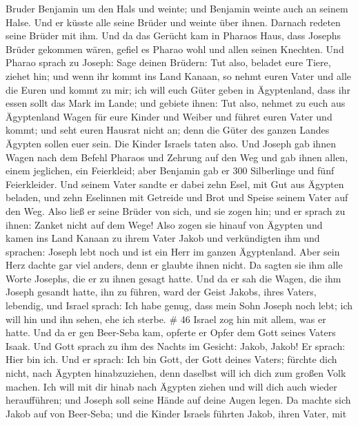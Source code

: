 Bruder Benjamin um den Hals und weinte; und Benjamin weinte auch an
seinem Halse.  Und er küsste alle seine Brüder und weinte
über ihnen. Darnach redeten seine Brüder mit ihm.  Und da
das Gerücht kam in Pharaos Haus, dass Josephs Brüder gekommen wären,
gefiel es Pharao wohl und allen seinen Knechten.  Und
Pharao sprach zu Joseph: Sage deinen Brüdern: Tut also, beladet eure
Tiere, ziehet hin;  und wenn ihr kommt ins Land Kanaan, so
nehmt euren Vater und alle die Euren und kommt zu mir; ich will euch
Güter geben in Ägyptenland, dass ihr essen sollt das Mark im Lande;
 und gebiete ihnen: Tut also, nehmet zu euch aus
Ägyptenland Wagen für eure Kinder und Weiber und führet euren Vater und
kommt;  und seht euren Hausrat nicht an; denn die Güter des
ganzen Landes Ägypten sollen euer sein.  Die Kinder Israels
taten also. Und Joseph gab ihnen Wagen nach dem Befehl Pharaos und
Zehrung auf den Weg  und gab ihnen allen, einem jeglichen,
ein Feierkleid; aber Benjamin gab er 300 Silberlinge und fünf
Feierkleider.  Und seinem Vater sandte er dabei zehn Esel,
mit Gut aus Ägypten beladen, und zehn Eselinnen mit Getreide und Brot
und Speise seinem Vater auf den Weg.  Also ließ er seine
Brüder von sich, und sie zogen hin; und er sprach zu ihnen: Zanket nicht
auf dem Wege!  Also zogen sie hinauf von Ägypten und kamen
ins Land Kanaan zu ihrem Vater Jakob  und verkündigten ihm
und sprachen: Joseph lebt noch und ist ein Herr im ganzen Ägyptenland.
Aber sein Herz dachte gar viel anders, denn er glaubte ihnen nicht.
 Da sagten sie ihm alle Worte Josephs, die er zu ihnen
gesagt hatte. Und da er sah die Wagen, die ihm Joseph gesandt hatte, ihn
zu führen, ward der Geist Jakobs, ihres Vaters, lebendig, 
und Israel sprach: Ich habe genug, dass mein Sohn Joseph noch lebt; ich
will hin und ihn sehen, ehe ich sterbe. \# 46  Israel zog
hin mit allem, was er hatte. Und da er gen Beer-Seba kam, opferte er
Opfer dem Gott seines Vaters Isaak.  Und Gott sprach zu ihm
des Nachts im Gesicht: Jakob, Jakob! Er sprach: Hier bin ich.
 Und er sprach: Ich bin Gott, der Gott deines Vaters;
fürchte dich nicht, nach Ägypten hinabzuziehen, denn daselbst will ich
dich zum großen Volk machen.  Ich will mit dir hinab nach
Ägypten ziehen und will dich auch wieder heraufführen; und Joseph soll
seine Hände auf deine Augen legen.  Da machte sich Jakob auf
von Beer-Seba; und die Kinder Israels führten Jakob, ihren Vater, mit
